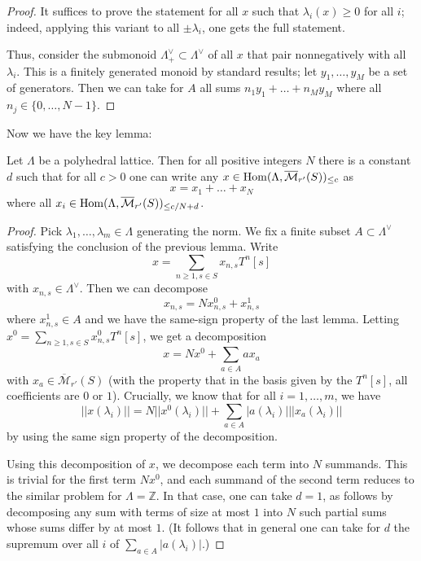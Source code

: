 \begin{proof}
  It suffices to prove the statement for all $x$ such that $\lambda_i(x)\geq 0$ for all $i$;
  indeed, applying this variant to all $\pm \lambda_i$, one gets the full statement.

  Thus, consider the submonoid $\Lambda^\vee_+\subset \Lambda^\vee$
  of all $x$ that pair nonnegatively with all $\lambda_i$.
  This is a finitely generated monoid by standard results;
  let $y_1,\ldots,y_M$ be a set of generators.
  Then we can take for $A$ all sums $n_1y_1+\ldots+n_My_M$ where all $n_j\in \{0,\ldots,N-1\}$.
\end{proof}

Now we have the key lemma:

\begin{lemma}
  \label{combi}
  Let $\Lambda$ be a polyhedral lattice.
  Then for all positive integers $N$ there is a constant $d$
  such that for all $c>0$ one can write any
  $x\in \operatorname{Hom}(\Lambda,\overline{\mathcal M}_{r'}(S))_{\leq c}$ as
  \[
    x=x_1+\ldots+x_N
  \]
  where all $x_i\in \operatorname{Hom}(\Lambda,\overline{\mathcal M}_{r'}(S))_{\leq c/N+d}$.
\end{lemma}

\begin{proof}
  Pick $\lambda_1,\ldots,\lambda_m\in \Lambda$ generating the norm. We fix a finite subset $A\subset \Lambda^\vee$ satisfying the conclusion of the previous lemma. Write
  \[
  x=\sum_{n\geq 1, s\in S} x_{n,s} T^n [s]
  \]
  with $x_{n,s}\in \Lambda^\vee$. Then we can decompose
  \[
  x_{n,s} = N x_{n,s}^0 + x_{n,s}^1
  \]
  where $x_{n,s}^1\in A$ and we have the same-sign property of the last lemma. Letting $x^0 = \sum_{n\geq 1, s\in S} x_{n,s}^0 T^n [s]$, we get a decomposition
  \[
  x = Nx^0 + \sum_{a\in A} a x_a
  \]
  with $x_a\in \overline{\mathcal M}_{r'}(S)$ (with the property that in the
  basis given by the $T^n [s]$, all coefficients are $0$ or $1$). Crucially,
  we know that for all $i=1,\ldots,m$, we have
  \[
  ||x(\lambda_i)|| = N ||x^0(\lambda_i)|| + \sum_{a\in A} |a(\lambda_i)| ||x_a(\lambda_i)||
  \]
  by using the same sign property of the decomposition.

  Using this decomposition of $x$, we decompose each term into $N$ summands.
  This is trivial for the first term $Nx^0$,
  and each summand of the second term reduces to the similar problem for $\Lambda=\mathbb Z$.
  In that case, one can take $d=1$,
  as follows by decomposing any sum with terms of size at most $1$
  into $N$ such partial sums whose sums differ by at most $1$.
  (It follows that in general one can take for $d$
  the supremum over all $i$ of $\sum_{a\in A} |a(\lambda_i)|$.)
\end{proof}



